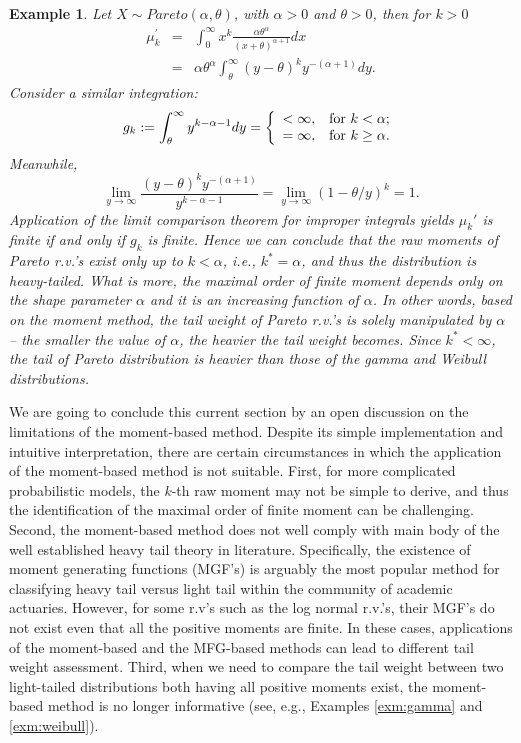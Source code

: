 \documentclass[12pt]{article}
\newtheorem{example}{\bf Example}
\begin{document}
\begin{example}  Let $X\sim Pareto(\alpha,\theta)$, with $\alpha>0$ and $\theta>0$, then for $k>0$
\begin{eqnarray*}
    \mu_k^{'} &=& \int_0^{\infty} x^k \frac{\alpha \theta^{\alpha}}{(x+\theta)^{\alpha+1}} dx \\
    &=& \alpha \theta^{\alpha} \int_{\theta}^{\infty} (y-\theta)^k {y^{-(\alpha+1)}} dy.
\end{eqnarray*}
Consider a similar integration:
\begin{eqnarray*}
  g_k:=\int_{\theta}^{\infty} {y^{k-\alpha-1}} dy=\left\{
  \begin{array}{ll}
    <\infty, & \hbox{for } k<\alpha;\\
    =\infty, & \hbox{for } k\geq \alpha.
  \end{array}
\right.
\end{eqnarray*}
Meanwhile,
\[\lim_{y\rightarrow \infty} \frac{(y-\theta)^k {y^{-(\alpha+1)}}}{y^{k-\alpha-1}}=\lim_{y\rightarrow \infty}
(1-\theta/y)^{k}=1.\]
Application of the limit comparison theorem for improper integrals yields $\mu_k'$ is finite if and only if $g_k$ is finite. Hence we can conclude that the raw moments of Pareto r.v.'s exist only up to $k<\alpha$, i.e., $k^{\ast}=\alpha$, and thus the distribution is heavy-tailed.  What is more, the maximal order of finite moment depends only on the shape parameter $\alpha$ and it is an increasing function of $\alpha$.  
In other words, based on the moment method, the tail weight of Pareto r.v.'s is solely manipulated by $\alpha$ --  the smaller the value of $\alpha$, the heavier the tail weight becomes.  Since $k^{\ast}<\infty$, the tail of Pareto distribution is heavier than those of the gamma and Weibull distributions.
\end{example}

We are going to conclude this current section by an open discussion on the limitations of the moment-based method.  Despite its simple implementation and intuitive interpretation, there are certain circumstances in which the application of the moment-based method is not suitable. First, for more complicated probabilistic models, the $k$-th raw moment may not be simple to derive, and thus the identification of the maximal order of finite moment can be challenging.  Second, the moment-based method does not well comply with main body of the well established heavy tail theory in literature.  Specifically, the existence of moment generating functions (MGF's) is arguably the most popular method for classifying heavy tail  versus light tail within the community of academic actuaries.  However, for some r.v's such as the log normal r.v.'s, their MGF's do not exist even that all the positive moments are finite.  In these cases, applications of the moment-based and the
MFG-based methods can lead to different tail weight assessment.  Third, when we need to compare the tail weight between two light-tailed distributions both having all positive moments exist, the moment-based method is no longer informative (see, e.g., Examples \ref{exm:gamma} and \ref{exm:weibull}).
\end{document}
